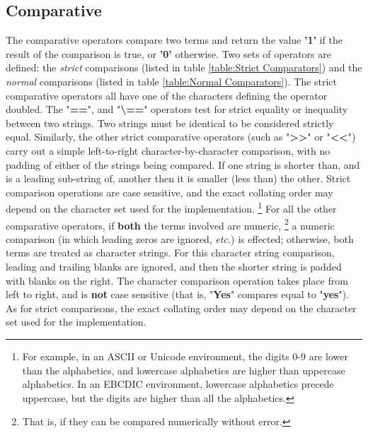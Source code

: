 \subsection{Comparative}\label{refcomps}
The comparative operators compare two terms and return the
value \textbf{'1'} if the result of the comparison is true,
or \textbf{'0'} otherwise.  Two sets of operators are defined: the
\emph{strict} comparisons (listed in table \ref{table:Strict
  Comparators}) and the \emph{normal} comparisons (listed in table
\ref{table:Normal Comparators}).
 The strict comparative operators all have one of the characters
defining the operator doubled.  The "\textbf{==}",
and "\textbf{\textbackslash ==}" operators
test for strict equality or inequality between two strings.
Two strings must be identical to be considered strictly equal.
Similarly, the other strict comparative operators (such as
"\textbf{>{}>}" or "\textbf{<{}<}") carry out a simple
left-to-right character-by-character comparison, with no padding of
either of the strings being compared.
If one string is shorter than, and is a leading sub-string of, another
then it is smaller (less than) the other.
Strict comparison operations are case sensitive, and the exact collating
order may depend on the character set used for the implementation.
\footnote{
For example, in an ASCII or Unicode environment, the digits 0-9
are lower than the alphabetics, and lowercase alphabetics are higher
than uppercase alphabetics.
In an EBCDIC environment, lowercase alphabetics precede uppercase, but
the digits are higher than all the alphabetics.
}
 For all the other comparative operators, if \textbf{both} the
terms involved are numeric,
\footnote{
That is, if they can be compared numerically without error.
}
a numeric comparison (in which leading zeros are ignored,
\emph{etc.}) is effected; otherwise, both terms are treated as character
strings.
For this character string comparison, leading and trailing blanks are
ignored, and then the shorter string is padded with blanks on the right.
The character comparison operation takes place from left to right, and
is \textbf{not} case sensitive (that is, "\textbf{Yes}"
compares equal to "\textbf{yes}").
As for strict comparisons, the exact collating order may depend on the
character set used for the implementation.

